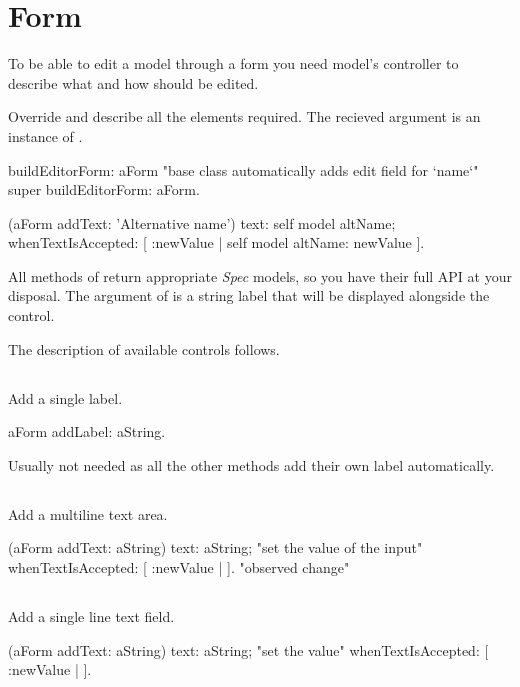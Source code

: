 \documentclass[a4paper,10pt,twoside]{book}
\begin{document}
\chapter{ Form}
To be able to edit a model through a form you need model's controller to describe what and how should be edited.

Override  and describe all the elements required. The recieved  argument is an instance of .


\begin{code}{}
buildEditorForm: aForm
	"base class automatically adds edit field for `name`"
	super buildEditorForm: aForm.

	(aForm addText: 'Alternative name')
		text: self model altName;
		whenTextIsAccepted: [ :newValue | self model altName: newValue ].
\end{code}


All  methods of  return appropriate \textit{Spec} models, so you have their full API at your disposal.
The argument of  is a string label that will be displayed alongside the control.

The description of available controls follows.
\section{ }
Add a single label.

\begin{code}{}
aForm addLabel: aString.
\end{code}

Usually not needed as all the other methods add their own label automatically.
\section{ }
Add a multiline text area.

\begin{code}{}
(aForm addText: aString)
	text: aString; "set the value of the input"
	whenTextIsAccepted: [ :newValue | ]. "observed change"
\end{code}

\section{ }
Add a single line text field.

\begin{code}{}
(aForm addText: aString)
	text: aString; "set the value"
	whenTextIsAccepted: [ :newValue | ].
\end{code}
\end{document}
